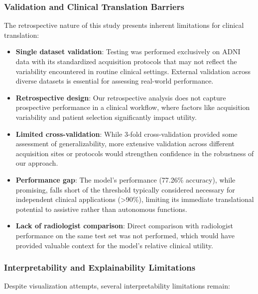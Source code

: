 \documentclass[12pt, a4paper]{article}
\begin{document}
\subsubsection{Validation and Clinical Translation Barriers}

The retrospective nature of this study presents inherent limitations for clinical translation:

\begin{itemize}
    \item \textbf{Single dataset validation}: Testing was performed exclusively on ADNI data with its standardized acquisition protocols that may not reflect the variability encountered in routine clinical settings. External validation across diverse datasets is essential for assessing real-world performance.
    
    \item \textbf{Retrospective design}: Our retrospective analysis does not capture prospective performance in a clinical workflow, where factors like acquisition variability and patient selection significantly impact utility.
    
    \item \textbf{Limited cross-validation}: While 3-fold cross-validation provided some assessment of generalizability, more extensive validation across different acquisition sites or protocols would strengthen confidence in the robustness of our approach.
    
    \item \textbf{Performance gap}: The model's performance (77.26\% accuracy), while promising, falls short of the threshold typically considered necessary for independent clinical applications (>90\%), limiting its immediate translational potential to assistive rather than autonomous functions.
    
    \item \textbf{Lack of radiologist comparison}: Direct comparison with radiologist performance on the same test set was not performed, which would have provided valuable context for the model's relative clinical utility.
\end{itemize}

\subsubsection{Interpretability and Explainability Limitations}
Despite visualization attempts, several interpretability limitations remain:
\end{document}
